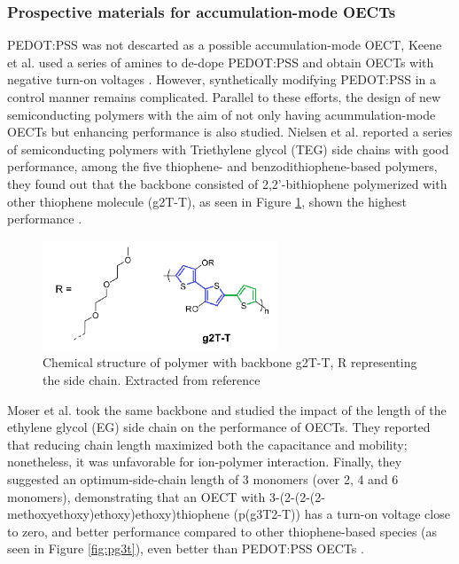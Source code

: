 \subsubsection{Prospective materials for accumulation-mode OECTs}
PEDOT:PSS was not descarted as a possible accumulation-mode OECT, Keene et al. used a series of amines to de-dope PEDOT:PSS and obtain OECTs with negative turn-on voltages \cite{keeneEnhancementModePEDOTPSS2020}. However, synthetically modifying PEDOT:PSS in a control manner remains complicated. Parallel to these efforts, the design of new semiconducting polymers with the aim of not only having acummulation-mode OECTs but enhancing performance is also studied. Nielsen et al. reported a series of semiconducting polymers with Triethylene glycol (TEG) side chains with good performance, among the five thiophene- and benzodithiophene-based polymers, they found out that the %
backbone consisted of 2,2'-bithiophene polymerized with other thiophene molecule (g2T-T), as seen in Figure \ref{fig:g2TT}, shown the highest performance %
\cite{nielsenMolecularDesignSemiconducting2016}.

\begin{figure}[h]
	\centering
	\includegraphics[width=7cm]{Images/pdf/g2T-T.pdf}
	\caption[Chemical structure of polymer g2T-T]{Chemical structure of polymer with backbone g2T-T, R representing the side chain. Extracted from reference \cite{nielsenMolecularDesignSemiconducting2016}}
	\label{fig:g2TT}
\end{figure}

Moser et al. took the same backbone and studied the impact of the length of the ethylene glycol (EG) side chain on the performance of OECTs. They reported that reducing chain length maximized both the capacitance and mobility; nonetheless, it was unfavorable for ion-polymer interaction. Finally, they suggested an optimum-side-chain length of 3 monomers (over 2, 4 and 6 monomers), demonstrating that an OECT with 3-(2-(2-(2-methoxyethoxy)ethoxy)ethoxy)thiophene (p(g3T2-T)) has a turn-on voltage close to zero, and better performance compared to other thiophene-based species (as seen in Figure \ref{fig:pg3t}), even better than PEDOT:PSS OECTs %
\cite{moserEthyleneGlycolBasedSide2020}.

